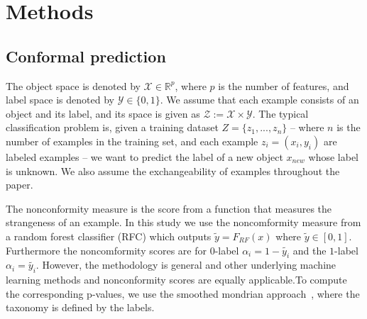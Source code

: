 \documentclass[main]{subfiles}
\begin{document}
\section{Methods}

\subsection{Conformal prediction}

The object space is denoted by $\mathcal{X} \in \mathbb{R}^p$, where $p$ is the number of features, and  label space is denoted by $\mathcal{Y} \in \{ 0,1 \}$. We assume that each example consists of an object and its label, and its space is given as $\mathcal{Z} := \mathcal{X} \times \mathcal{Y}$. %
The typical classification problem is, given a training dataset $Z = \{ z_1 , ..., z_n \} $ -- where $n$ is the number of examples in the training set, and each example $z_i = (x_i, y_i)$ are labeled examples -- we want to predict the label of a new object $x_{new}$ whose label is unknown. We also assume the exchangeability of examples throughout the paper.


The nonconformity measure is the score from a function that measures the strangeness of an example. In this study we use the noncomformity measure from a random forest classifier (RFC) which outputs $\tilde{y}=F_{RF}(x)$ where $\tilde{y} \in [0,1]$. Furthermore the noncomformity scores are for $0$-label $\alpha_{i} = 1-\tilde{y_{i}}$ and the $1$-label $\alpha_{i} = \tilde{y_{i}}$. However, the methodology is general and other underlying machine learning methods and nonconformity scores are equally applicable.To compute the corresponding p-values, we use the smoothed mondrian approach~\citep{vovk2005algorithmic}, where the taxonomy is defined by the labels.
\end{document}
